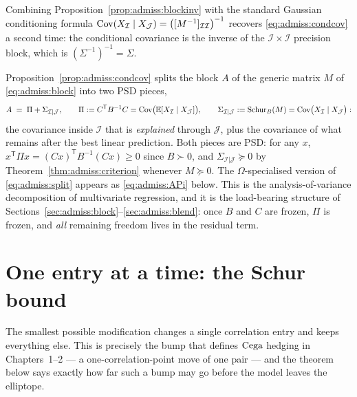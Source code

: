 Combining Proposition~\ref{prop:admiss:blockinv} with the standard Gaussian
conditioning formula
$\operatorname{Cov}(X_{\mathcal I} \mid X_{\mathcal J}) = \bigl([M^{-1}]_{\mathcal I
\mathcal I}\bigr)^{-1}$ recovers \eqref{eq:admiss:condcov} a second time:
the conditional covariance is the inverse of the
$\mathcal I \times \mathcal I$ precision block, which is
$(\Sigma^{-1})^{-1} = \Sigma$.

\begin{remark}\label{rem:admiss:explained}
Proposition~\ref{prop:admiss:condcov} splits the block $A$ of the generic
matrix $M$ of \eqref{eq:admiss:block} into two PSD pieces,
\begin{equation}\label{eq:admiss:split}
  A \;=\; \Pi + \Sigma_{\mathcal I | \mathcal J},
  \qquad
  \Pi := C^{\mathsf T} B^{-1} C
       = \operatorname{Cov}\bigl(\mathbb{E}[X_{\mathcal I} \mid X_{\mathcal J}]\bigr),
  \qquad
  \Sigma_{\mathcal I | \mathcal J} := \mathrm{Schur}_{B}\!\left(M\right)
       = \operatorname{Cov}\bigl(X_{\mathcal I} \mid X_{\mathcal J}\bigr):
\end{equation}
the covariance inside $\mathcal I$ that is \emph{explained} through
$\mathcal J$, plus the covariance of what remains after the best linear
prediction. Both pieces are PSD: for any $x$,
$x^{\mathsf T} \Pi x = (C x)^{\mathsf T} B^{-1} (C x) \ge 0$ since
$B \succ 0$, and $\Sigma_{\mathcal I|\mathcal J} \succeq 0$ by
Theorem~\ref{thm:admiss:criterion} whenever $M \succeq 0$. The
$\Omega$-specialised version of \eqref{eq:admiss:split} appears as
\eqref{eq:admiss:APi} below. This is the analysis-of-variance decomposition of
multivariate regression, and it is the load-bearing structure of
Sections~\ref{sec:admiss:block}--\ref{sec:admiss:blend}: once $B$ and $C$
are frozen, $\Pi$ is frozen, and \emph{all} remaining freedom lives in the
residual term.
\end{remark}

\section{One entry at a time: the Schur bound}\label{sec:admiss:single}

The smallest possible modification changes a single
correlation entry and keeps everything else. This is precisely the bump that
defines $\mathrm{Cega}$ hedging in Chapters~1--2 --- a one-correlation-point move of
one pair --- and the theorem below says exactly how far such a bump may go
before the model leaves the elliptope.

